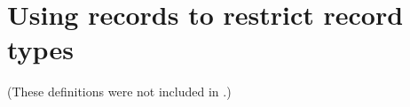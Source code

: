 


\section{Using records to restrict %
  record types}
\label{app:specrec}

(These definitions were not included in \citealp{Cooper2012}.)


 
 
